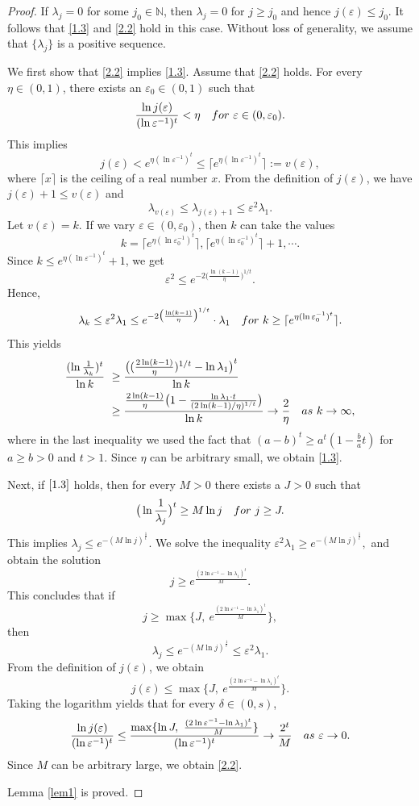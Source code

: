 \documentclass[10pt,a4paper]{amsart}
\numberwithin{equation}{section}
\def\vz{\varepsilon}
\def\lz{\lambda}
\newcommand{\NN}{\mathbb{N}}
\def\NN{{\mathbb N}}
\begin{document}
\begin{proof}If $\lz_{j}=0$ for
some $j_0\in\NN$, then $\lambda_j=0$ for $j\ge j_0$ and hence
$j(\vz)\le j_0$. It follows that \eqref{1.3} and \eqref{2.2} hold in this case. Without loss of generality, we
assume that $\{\lz_j\}$ is a positive sequence.

We first show that \eqref{2.2} implies \eqref{1.3}. Assume that
\eqref{2.2} holds. For every $\eta\in(0,1)$, there exists an
$\vz_0\in(0,1)$ such that
$$\frac{\ln j(\vz)}{(\ln \vz^{-1})^t}<\eta  \ \ \ {\rm for}\  \vz\in(0,\vz_0).$$
This implies
$$j(\vz)<e^{\eta (\ln\vz^{-1})^t} \le \lceil e^{\eta (\ln\vz^{-1})^t}\rceil :=v(\vz),$$
where $\lceil x\rceil$  is the ceiling of a real number $x$.  From the definition of $j(\vz)$, we
have $j(\vz)+1\le v(\vz)$ and
$$\lambda_{v(\vz)}\le \lambda_{j(\vz)+1}\le \vz^2\lz_1.$$
Let $v(\vz)=k$. If we vary $\vz\in(0,\vz_0)$, then $k$ can take the
values
$$k= \lceil e^{\eta (\ln\vz_0^{-1})^t} \rceil,\lceil e^{\eta (\ln\vz_0^{-1})^t}\rceil+1,\cdots.$$
Since $k\le e^{\eta (\ln\vz^{-1})^t}+1$, we get
$$\vz^{2}\le e^{-2\big(\frac{\ln (k-1)}{\eta}\big)^{1/t}}.$$
Hence, $$\lambda_{k}\le \vz^2\lz_1\le  e^{-2\big(\frac{\ln
(k-1)}{\eta}\big)^{1/t}}\cdot\lz_1\ \  \ {\rm for}\  k\ge \lceil
e^{\eta (\ln\vz_0^{-1})^t}\rceil. $$  This  yields
  \begin{align*}\frac{(\ln\frac{1}{\lambda_{k}})^t}{\ln k}\
  &\ge\frac{\big((\frac{ 2\ln(k-1)}{\eta})^{1/t}-\ln\lz_1\big)^t}{\ln k}\\&\ge
  \frac{\frac{2\ln(k-1)}{\eta}\big(1-\frac{\ln \lz_1\cdot t}{(2 \ln(k-1)/\eta)^{1/t}}\big)}{\ln k}\to \frac{2}{\eta}
  \ \ \ {\rm as \ }k\to\infty,\end{align*}where in
  the last inequality we used the fact that
$(a-b)^t\ge a^t(1-\frac{b}{a}t)$ for $a\ge b> 0$ and $t>1$. Since $\eta$ can be arbitrary small, we obtain \eqref{1.3}.

Next, if $\eqref{1.3}$ holds, then for every $M>0$ there exists a
$J>0$ such that
$$\big(\ln\frac{1}{\lambda_j}\big)^t\geq M\ln j \ \ \ {\rm for}\ j\geq J.$$
This implies $\lambda_j\le e^{-(M\ln j)^{\frac{1}{t}}}$. We solve
the inequality $\vz^2\lz_1\ge  e^{-(M\ln j)^{\frac{1}{t}}},$ and obtain the solution
$$j\ge e^{\frac{(2\ln\vz^{-1}-\ln\lz_1)^t}{M}}.$$
This concludes that if $$j\ge \max\{J,\
e^{\frac{(2\ln\vz^{-1}-\ln\lz_1)^t}{M}}\},$$ then $$\lz_j\le
e^{-(M\ln j)^{\frac{1}{t}}}\le \vz^2\lz_1.$$
 From the definition of $j(\vz)$, we obtain
$$j(\vz)\le \max\{J,\  e^{\frac{(2\ln\vz^{-1}-\ln\lz_1)^t}{M}}\}.$$
Taking the logarithm yields that for every $\delta\in(0,s)$,
$$\frac{\ln j(\vz)}{(\ln \vz^{-1})^t}\le \frac{\max\{\ln J,\ \frac{(2\ln\vz^{-1}-\ln\lz_1)^t}{M}\}}{(\ln \vz^{-1})^t}\to
\frac{2^t}M
  \ \ \ {\rm as \ }\vz\to 0.$$
Since $M$ can be arbitrary large, we obtain \eqref{2.2}.

Lemma \ref{lem1} is proved.
\end{proof}
\end{document}
